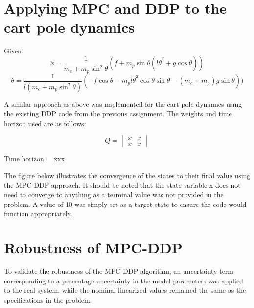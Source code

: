 \documentclass{article}
\begin{document}
\section{Applying MPC and DDP to the cart pole dynamics}

Given:
\begin{equation}
\ddot{x} = \frac{1}{m_c + m_p{\sin}^2\theta}(f + m_p \sin\theta(l{\dot{\theta}}^2 + g\cos\theta))
\end{equation}
\begin{equation}
\ddot{\theta} = \frac{1}{l(m_c + m_p{\sin}^2{\theta})}(-f\cos\theta - m_pl{\dot{\theta}}^2\cos{\theta}\sin{\theta} - (m_c + m_p)g\sin\theta))
\end{equation}


A similar approach as above was implemented for the cart pole dynamics using 		the existing DDP code from the previous assignment. The weights and time 			horizon used are as follows:

$$
Q = 
\begin{vmatrix}
x & x \\ x & x
\end{vmatrix}
$$

\begin{center}
Time horizon = xxx
\end{center}

The figure below illustrates the convergence of the states to their final value using the MPC-DDP approach. It should be noted that the state variable x does not need to converge to anything as a terminal value was not provided in the problem. A value of 10 was simply set as a target state to ensure the code would function appropriately.

\section{Robustness of MPC-DDP}

To validate the robustness of the MPC-DDP algorithm, an uncertainty term corresponding to a percentage uncertainty in the model parameters was applied to the real system, while the nominal linearized values remained the same as the specifications in the problem.
\end{document}
